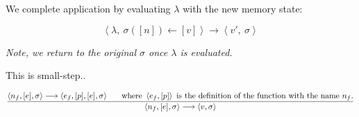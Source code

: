 We complete application by evaluating $\lambda$ with the new memory state:

\begin{equation}
\left\langle \lambda,\ \sigma([n])\leftarrow[v]\right\rangle
\longrightarrow
\left\langle v',\ \sigma\right\rangle
\end{equation}

\emph{Note, we return to the original $\sigma$ once $\lambda$ is evaluated.}

\newpage

This is small-step..

\begin{equation}
{
\left\langle n_f, [e], \sigma\right\rangle
\longrightarrow
\left\langle e_f, [p], [e], \sigma\right\rangle
\ \ \ \ \ \text{where}\ \left\langle e_f, [p] \right\rangle
\ \text{is the definition of the function with the name}\ n_f\text{.}
\over
\left\langle n_f, [e], \sigma\right\rangle
\longrightarrow
\left\langle v, \sigma\right\rangle
}
\end{equation}
